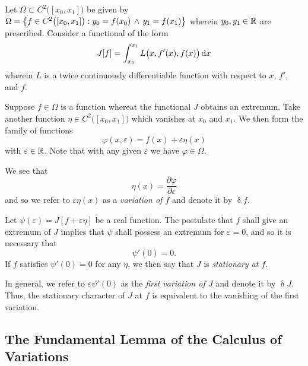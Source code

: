 Let \(\Omega \subset C^2\big([x_0, x_1]\big)\) be given by \(\Omega = \set*{f \in C^2\big([x_0, x_1]\big) : y_0 = f(x_0)
\, \land \, y_1 = f(x_1)}\) wherein \(y_0, y_1 \in \setreal\) are prescribed. Consider a functional of the form
\begin{align}
  \label{eq0}
  J[f] = \int_{x_0}^{x_1} L\big(x, f'(x), f(x)\big) \diff x
\end{align}
wherein \(L\) is a twice continuously differentiable function with respect to \(x\), \(f'\), and \(f\).

Suppose \(f \in \Omega\) is a function whereat the functional \(J\) obtains an extremum. Take another function
\(\eta \in C^2\big([x_0, x_1]\big)\) which vanishes at \(x_0\) and \(x_1\). We then form the family of functions
\[
  \varphi(x, \varepsilon) = f(x) + \varepsilon \eta(x)
\]
with \(\varepsilon \in \setreal\). Note that with any given \(\varepsilon\) we have \(\varphi \in \Omega\).

We see that
\[
  \eta(x) = \frac{\partial \varphi}{\partial \varepsilon}
\]
and so we refer to \(\varepsilon \eta(x)\) as a \emph{variation of \(f\)} and denote it by \(\updelta f\).

Let \(\psi(\varepsilon) = J[f + \varepsilon \eta]\) be a real function. The postulate that \(f\) shall give an extremum
of \(J\) implies that \(\psi\) shall possess an extremum for \(\varepsilon = 0\), and so it is necessary that
\[
  \psi'(0) = 0.
\]
If \(f\) satisfies \(\psi'(0) = 0\) for any \(\eta\), we then say that \(J\) is \emph{stationary at \(f\)}.

In general, we refer to \(\varepsilon \psi'(0)\) as the \emph{first variation of \(J\)} and denote it by \(\updelta J\).
Thus, the stationary character of \(J\) at \(f\) is equivalent to the vanishing of the first variation.

\subsection{The Fundamental Lemma of the Calculus of Variations}

